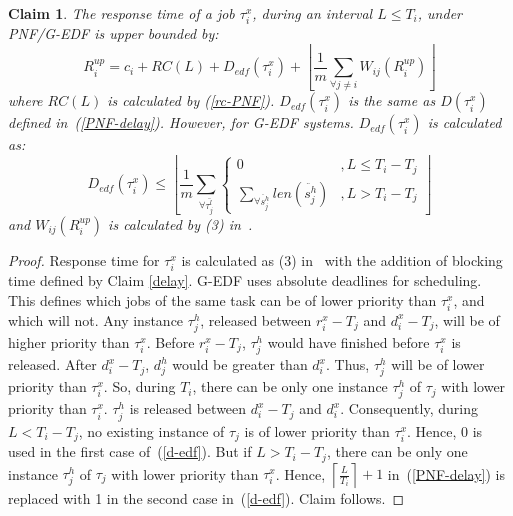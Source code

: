 \documentclass[a4paper,english]{article}
\newtheorem{clm}{Claim}
\newtheorem{proof}{Proof}
\begin{document}
\begin{clm}\label{response time ecm PNF}
The response time of a job $\tau_{i}^{x}$, during an interval $L\le T_{i}$, under PNF/G-EDF is upper bounded by:
\begin{equation}
R_{i}^{up}=c_{i}+RC(L)+D_{edf}(\tau_{i}^{x})+\left\lfloor \frac{1}{m}\sum_{\forall j\ne i}W_{ij}(R_{i}^{up})\right\rfloor 
\end{equation}
where $RC(L)$ is calculated by (\ref{rc-PNF}). $D_{edf}(\tau_{i}^{x})$
is the same as $D(\tau_{i}^{x})$ defined in~(\ref{PNF-delay}). However, for G-EDF systems. $D_{edf}(\tau_i^x)$ is calculated as:
\begin{equation}
D_{edf}(\tau_{i}^{x})\le\left\lfloor \frac{1}{m}\sum_{\forall\bar{\tau_{j}^{l}}}\begin{cases}
0 & ,L\le T_{i}-T_{j}\\
\sum_{\forall\ddot{s_{j}^{h}}}len\left(\ddot{s_{j}^{h}}\right) & ,L>T_{i}-T_{j}
\end{cases}\right\rfloor \label{d-edf}
\end{equation}
and $W_{ij}(R_{i}^{up})$ is calculated by (3) in~\cite{stmconcurrencycontrol:emsoft11}.
\end{clm}
\begin{proof}\normalfont
Response time for $\tau_{i}^{x}$ is calculated as (3) in~\cite{stmconcurrencycontrol:emsoft11} with the addition of blocking time defined by Claim \ref{delay}. G-EDF uses absolute deadlines for scheduling. This defines which jobs of the same task can be of lower priority than $\tau_{i}^{x}$, and which will not. Any instance $\tau_j^h$, released between $r_i^x - T_j$ and $d_i^x - T_j$, will be of higher priority than $\tau_i^x$. Before $r_i^x-T_j$, $\tau_j^h$ would have finished before $\tau_i^x$ is released. After $d_i^x-T_j$, $d_j^h$ would be greater than $d_i^x$. Thus, $\tau_j^h$ will be of lower priority than $\tau_i^x$. So, during $T_i$, there can be only one instance $\tau_j^h$ of $\tau_j$ with lower priority than $\tau_i^x$. $\tau_j^h$ is released between $d_i^x-T_j$ and $d_i^x$. Consequently, during $L<T_i-T_j$, no existing instance of $\tau_j$ is of lower  priority than $\tau_i^x$. Hence, 0 is used in the first case of~(\ref{d-edf}). But if $L>T_i-T_j$, there can be only one instance $\tau_j^h$ of $\tau_j$ with lower priority than $\tau_i^x$. Hence, $\left\lceil\frac{L}{T_i}\right\rceil+1$ in~(\ref{PNF-delay}) is replaced with 1 in the second case in~(\ref{d-edf}). Claim follows.
\end{proof}
\end{document}

